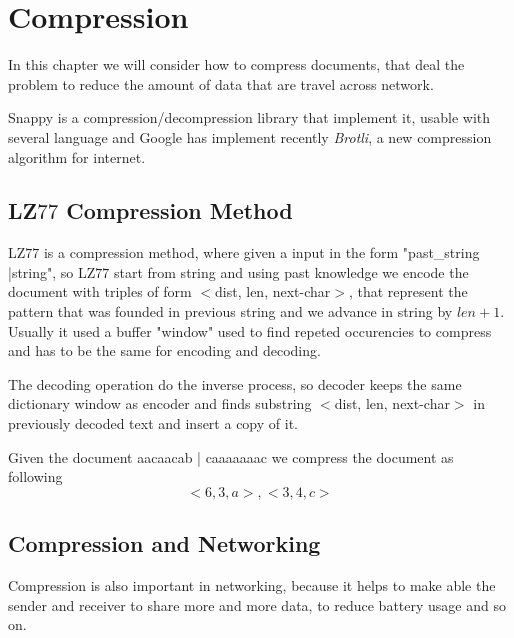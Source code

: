 \chapter{Compression}
In this chapter we will consider how to compress documents, that deal the problem to reduce 
the amount of data that are travel across network.

Snappy is a compression/decompression library that implement it, usable with several language and 
Google has implement recently \emph{Brotli}, a new compression algorithm for internet.

\section{LZ$77$ Compression Method}
LZ$77$ is a compression method, where given a input in the form "past\_string
|string", so LZ$77$ start from string and using past knowledge 
we encode the document with triples of form $<$dist, len, next-char$>$,
that represent the pattern that was founded in previous string and
we advance in string by $len + 1$.\newline
Usually it used a buffer "window" used to find repeted occurencies to compress and has to be 
the same for encoding and decoding.

The decoding operation do the inverse process, so decoder keeps the same dictionary window as
encoder and finds substring $<$dist, len, next-char$>$ in previously decoded text and 
insert a copy of it.

\begin{esempio}
	Given the document aacaacab | caaaaaaac we compress the document as following
	\[ <6, 3, a>, <3, 4, c> \]
\end{esempio}

\section{Compression and Networking}
Compression is also important in networking, because it helps to make able the sender and receiver
to share more and more data, to reduce battery usage and so on.

